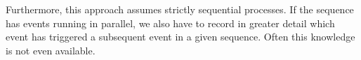 \documentclass[./../../paper.tex]{subfiles}
\begin{document}
Furthermore, this approach assumes strictly sequential processes. If the sequence has events running in parallel, we also have to record in greater detail which event has triggered a subsequent event in a given sequence. Often this knowledge is not even available.

\end{document}
